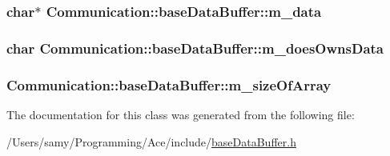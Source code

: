 \subsubsection[{m\+\_\+data}]{\setlength{\rightskip}{0pt plus 5cm}char$\ast$ Communication\+::base\+Data\+Buffer\+::m\+\_\+data\hspace{0.3cm}{\ttfamily [private]}}\label{class_communication_1_1base_data_buffer_aff8ef162426de4ffea7bb676c37afbb7}
\hypertarget{class_communication_1_1base_data_buffer_a44ddaf7e9a49bb129884d12e49a9a32f}{}
\subsubsection[{m\+\_\+does\+Owns\+Data}]{\setlength{\rightskip}{0pt plus 5cm}char Communication\+::base\+Data\+Buffer\+::m\+\_\+does\+Owns\+Data\hspace{0.3cm}{\ttfamily [private]}}\label{class_communication_1_1base_data_buffer_a44ddaf7e9a49bb129884d12e49a9a32f}
\hypertarget{class_communication_1_1base_data_buffer_ab6707a9f4866fb30efd51fc94d34bf49}{}
\subsubsection[{m\+\_\+size\+Of\+Array}]{ Communication\+::base\+Data\+Buffer\+::m\+\_\+size\+Of\+Array\hspace{0.3cm}{\ttfamily [private]}}\label{class_communication_1_1base_data_buffer_ab6707a9f4866fb30efd51fc94d34bf49}


The documentation for this class was generated from the following file\+:\begin{DoxyCompactItemize}
\item 
/\+Users/samy/\+Programming/\+Ace/include/\hyperlink{base_data_buffer_8h}{base\+Data\+Buffer.\+h}\end{DoxyCompactItemize}
